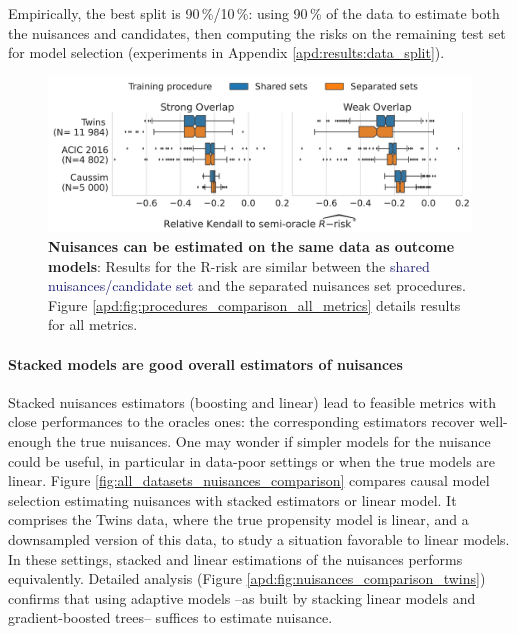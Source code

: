 \documentclass[a4paper,num-refs]{oup-contemporary}%
\begin{document}
Empirically, the best split is 90\,\%/10\,\%:
using 90\,\% of the data
to estimate both the nuisances and candidates, then computing the risks on the
remaining test set for model selection (experiments in Appendix
\ref{apd:results:data_split}).

\begin{figure}[!tb]
    \centering\begin{minipage}{\linewidth}
        \includegraphics[width=\linewidth]{_3_procedure_r_risk_only_3datasets_twocols.pdf}
    \end{minipage}

    \caption{\textbf{Nuisances can be estimated on the same data as outcome
            models}: Results for the R-risk are similar between the
        \textcolor{MidnightBlue}{shared
            nuisances/candidate set} and
        the \textcolor{RedOrange}{separated nuisances set} procedures. Figure
        \ref{apd:fig:procedures_comparison_all_metrics} details results for all metrics.}\label{fig:procedures_comparison}
\end{figure}

\paragraph{Stacked models are good overall estimators of nuisances}

Stacked nuisances estimators (boosting and linear) lead to feasible
metrics with close performances to the oracles ones: the
corresponding estimators recover well-enough the true nuisances.
One may wonder if simpler models for the nuisance could be useful,
in particular in data-poor settings or when the true models are linear.
Figure \ref{fig:all_datasets_nuisances_comparison} compares causal model
selection estimating nuisances with stacked estimators or linear model.
It comprises the Twins data, where the true propensity model is linear,
and a downsampled version of this data, to study a situation favorable to
linear models. In these settings,
stacked and linear estimations of the nuisances performs equivalently.
Detailed analysis (Figure \ref{apd:fig:nuisances_comparison_twins})
confirms that using adaptive models --as built by
stacking linear models and gradient-boosted trees-- suffices to estimate nuisance.
\end{document}
